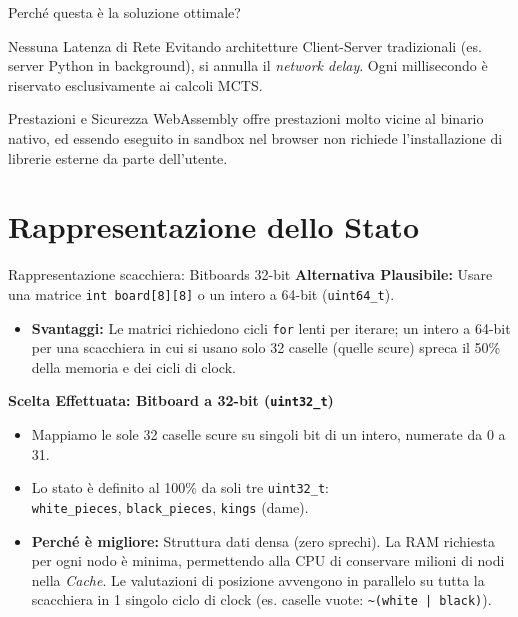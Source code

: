 \documentclass[10pt]{beamer}
\begin{document}
\begin{frame}{Perché questa è la soluzione ottimale?}
    \begin{block}{Nessuna Latenza di Rete}
        Evitando architetture Client-Server tradizionali (es. server Python in background), si annulla il \textit{network delay}. Ogni millisecondo è riservato esclusivamente ai calcoli MCTS.
    \end{block}
    
    \begin{block}{Prestazioni e Sicurezza}
        WebAssembly offre prestazioni molto vicine al binario nativo, ed essendo eseguito in sandbox nel browser non richiede l'installazione di librerie esterne da parte dell'utente.
    \end{block}
\end{frame}

\section{Rappresentazione dello Stato}
\begin{frame}{Rappresentazione scacchiera: Bitboards 32-bit}
    \textbf{Alternativa Plausibile:} Usare una matrice \texttt{int board[8][8]} o un intero a 64-bit (\texttt{uint64\_t}).
    \begin{itemize}
        \item \textbf{Svantaggi:} Le matrici richiedono cicli \texttt{for} lenti per iterare; un intero a 64-bit per una scacchiera in cui si usano solo 32 caselle (quelle scure) spreca il 50\% della memoria e dei cicli di clock.
    \end{itemize}
    
    \vspace{0.1cm}
    \textbf{Scelta Effettuata: Bitboard a 32-bit (\texttt{uint32\_t})}
    \begin{itemize}
        \item Mappiamo le sole 32 caselle scure su singoli bit di un intero, numerate da 0 a 31.
        \item Lo stato è definito al 100\% da soli tre \texttt{uint32\_t}: \\
        \texttt{white\_pieces}, \texttt{black\_pieces}, \texttt{kings} (dame).
        \item \textbf{Perché è migliore:} Struttura dati densa (zero sprechi). La RAM richiesta per ogni nodo è minima, permettendo alla CPU di conservare milioni di nodi nella \textit{Cache}. Le valutazioni di posizione avvengono in parallelo su tutta la scacchiera in 1 singolo ciclo di clock (es. caselle vuote: \texttt{\textasciitilde(white | black)}).
    \end{itemize}
\end{frame}
\end{document}
